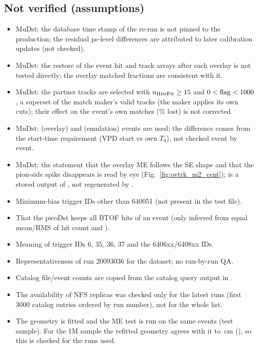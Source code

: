 \subsection{Not verified (assumptions)}
\begin{itemize}
\item MuDst: the database time stamp of the re-run is not pinned to the production; the residual ps-level differences
  are attributed to later calibration updates (not checked).
\item MuDst: the restore of the event hit and track arrays after each overlay is not tested directly; the overlay matched
  fractions are consistent with it.
\item MuDst: the partner tracks are selected with $n_{\rm HitsFit}\ge15$ and $0<{\rm flag}<1000$, a superset of the match
  maker's valid tracks (the maker applies its own cuts); their effect on the event's own matches (\ovtSElose\% lost) is not
  corrected.
\item MuDst: \ovEvMtwo{} (overlay) and \muEvMtwo{} (emulation) events are used; the difference comes from the start-time
  requirement (VPD start vs own $T_0$), not checked event by event.
\item MuDst: the statement that the overlay ME follows the SE shape and that the pion-side spike disappears is read by eye
  (Fig.~\ref{fig:ovtrk_m2_cent});  is a stored output of , not regenerated by
  .
\item Minimum-bias trigger IDs other than 640051 (not present in the test file).
\item That the picoDst keeps all BTOF hits of an event (only inferred from equal mean/RMS of
  hit count and ).
\item Meaning of trigger IDs 6, 35, 36, 37 and the 6406xx/6408xx IDs.
\item Representativeness of run 20093036 for the dataset; no run-by-run QA.
\item Catalog file/event counts are copied from the catalog query output in .
\item The availability of NFS replicas was checked only for the latest runs (first 3000 catalog
  entries ordered by run number), not for the whole list.
\item The geometry is fitted and the ME test is run on the same events (test sample). For the 1M sample the
  refitted geometry agrees with it to \geoCmpMeanVthree\,cm (), so this is checked for the runs used.

\end{itemize}
